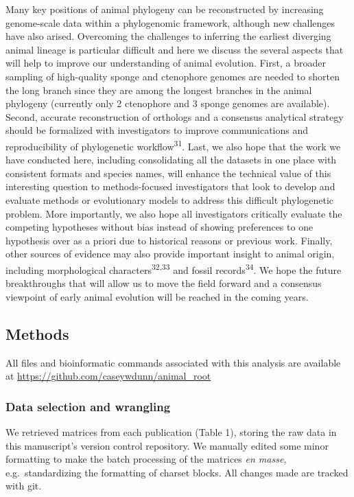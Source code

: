 \documentclass[]{article}
\begin{document}
Many key positions of animal phylogeny can be reconstructed by
increasing genome-scale data within a phylogenomic framework, although
new challenges have also arised. Overcoming the challenges to inferring
the earliest diverging animal lineage is particular difficult and here
we discuss the several aspects that will help to improve our
understanding of animal evolution. First, a broader sampling of
high-quality sponge and ctenophore genomes are needed to shorten the
long branch since they are among the longest branches in the animal
phylogeny (currently only 2 ctenophore and 3 sponge genomes are
available). Second, accurate reconstruction of orthologs and a consensus
analytical strategy should be formalized with investigators to improve
communications and reproducibility of phylogenetic
workflow\textsuperscript{31}. Last, we also hope that the work we have
conducted here, including consolidating all the datasets in one place
with consistent formats and species names, will enhance the technical
value of this interesting question to methods-focused investigators that
look to develop and evaluate methods or evolutionary models to address
this difficult phylogenetic problem. More importantly, we also hope all
investigators critically evaluate the competing hypotheses without bias
instead of showing preferences to one hypothesis over as a priori due to
historical reasons or previous work. Finally, other sources of evidence
may also provide important insight to animal origin, including
morphological characters\textsuperscript{32,33} and fossil
records\textsuperscript{34}. We hope the future breakthroughs that will
allow us to move the field forward and a consensus viewpoint of early
animal evolution will be reached in the coming years.

\hypertarget{methods}{%
\subsection{Methods}\label{methods}}

All files and bioinformatic commands associated with this analysis are
available at \url{https://github.com/caseywdunn/animal_root}

\hypertarget{data-selection-and-wrangling}{%
\subsubsection{Data selection and
wrangling}\label{data-selection-and-wrangling}}

We retrieved matrices from each publication (Table 1), storing the raw
data in this manuscript's version control repository. We manually edited
some minor formatting to make the batch processing of the matrices
\emph{en masse}, e.g.~standardizing the formatting of charset blocks.
All changes made are tracked with git.
\end{document}
